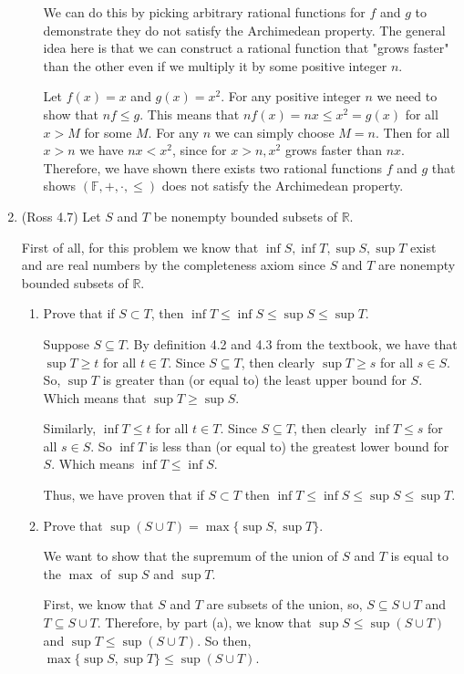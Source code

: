 \documentclass [10pt]{article}
\newcommand{\jg}[1]{{\color{blue} #1}}
\begin{document}
\begin{enumerate}
\begin{enumerate}
{We can do this by picking arbitrary rational functions for $f$ and $g$ to demonstrate they do not satisfy the Archimedean property. The general idea here is that we can construct a rational function that "grows faster" than the other even if we multiply it by some positive integer $n$. 

Let $f(x) = x$ and $g(x) = x^2$. For any positive integer $n$ we need to show that $n f \leq g$. This means that $n f(x) = nx \leq x^2 = g(x)$ for all $x > M$ for some $M$. For any $n$ we can simply choose $M = n$. Then for all $x > n$ we have $n x < x^2$, since for $x > n, x^2$ grows faster than $nx$. Therefore, we have shown there exists two rational functions $f$ and $g$ that shows $(\mathbb{F}, +, \cdot, \leq)$ does not satisfy the Archimedean property. 
}

\end{enumerate}
\clearpage
\item (Ross 4.7) Let $S$ and $T$ be nonempty bounded subsets of $\mathbb{R}$.

\jg{
First of all, for this problem we know that $\inf S, \inf T, \sup S, \sup T$ exist and are real numbers by the completeness axiom since $S$ and $T$ are nonempty bounded subsets of $\mathbb{R}$. 
}
\begin{enumerate}
\item Prove that if $S \subset T$, then $\inf T \leq \inf S \leq \sup S \leq \sup T$.

\jg{
Suppose $S \subseteq T$. By definition 4.2 and 4.3 from the textbook, we have that $\sup T \geq t$ for all $t \in T$. Since $S \subseteq T$, then clearly $\sup T \geq s$ for all $s \in S$. So, $\sup T$ is greater than (or equal to) the least upper bound for $S$. Which means that $\sup T \geq \sup S$. 

Similarly, $\inf T \leq t$ for all $t \in T$. Since $S \subseteq T$, then clearly $\inf T \leq s$ for all $s \in S$. So $\inf T$ is less than (or equal to) the greatest lower bound for $S$. Which means $\inf T \leq \inf S$. 

Thus, we have proven that if $S \subset T$ then $\inf T \leq \inf S \leq \sup S \leq \sup T$. 
}
\item Prove that $\sup (S \cup T) = \max \{ \sup S, \sup T\}$.

\jg{
We want to show that the supremum of the union of $S$ and $T$ is equal to the $\max$ of $\sup S$ and $\sup T$. 

First, we know that $S$ and $T$ are subsets of the union, so, $S \subseteq S \cup T$ and $T \subseteq S \cup T$. Therefore, by part (a), we know that $\sup S \leq \sup(S \cup T)$ and $\sup T \leq \sup(S \cup T)$. So then, $\max \{ \sup S, \sup T \} \leq \sup(S \cup T)$. 

}
\end{enumerate}
\end{enumerate}
\end{document}
